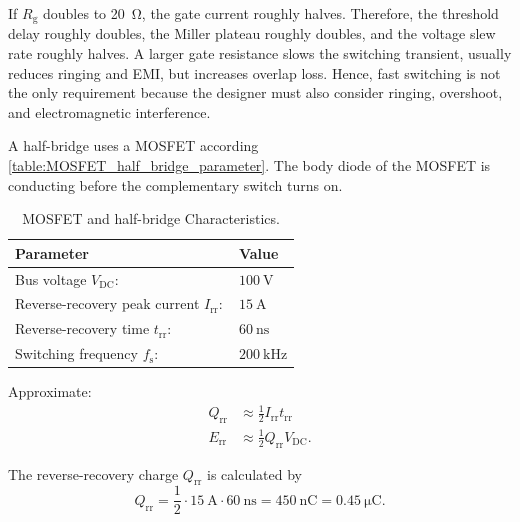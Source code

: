 \begin{solutionblock}
    If $R_\mathrm{g}$ doubles to \SI{20}{\ohm}, the gate current roughly halves. Therefore,
    the threshold delay roughly doubles, the Miller plateau roughly doubles, and the voltage slew rate roughly halves.
    A larger gate resistance slows the switching transient, usually reduces ringing and EMI, but increases overlap loss.
    Hence, fast switching is not the only requirement because the designer must also consider ringing, overshoot, and electromagnetic interference.
\end{solutionblock}




A half-bridge uses a MOSFET according \autoref{table:MOSFET_half_bridge_parameter}. The body diode of the MOSFET is conducting 
before the complementary switch turns on.

\begin{table}[ht]
    \centering
    \begin{tabular}{ll}
        \toprule
        Parameter & Value\\
        \midrule
        Bus voltage $V_\mathrm{DC}:$ & $\SI{100}{\volt}$\\
        Reverse-recovery peak current $I_\mathrm{rr}:$ & $\SI{15}{\ampere}$\\
        Reverse-recovery time $t_\mathrm{rr}:$ & $\SI{60}{\nano\second}$   \\
        Switching frequency $f_\mathrm{s}:$ & $\SI{200}{\kilo\hertz}$      \\   
        \bottomrule
    \end{tabular}
    \caption{MOSFET and half-bridge Characteristics.}
    \label{table:MOSFET_half_bridge_parameter}
\end{table}

Approximate:
\begin{align*}
    Q_\mathrm{rr} &\approx \frac{1}{2} I_\mathrm{rr} t_\mathrm{rr} \\
    E_\mathrm{rr} &\approx \frac{1}{2} Q_\mathrm{rr} V_\mathrm{DC}.
\end{align*}


\begin{solutionblock}
    The reverse-recovery charge $Q_\mathrm{rr}$ is calculated by
    \begin{equation}
        Q_\mathrm{rr}
        = \frac{1}{2} \cdot \SI{15}{\ampere} \cdot \SI{60}{\nano\second}
        = \SI{450}{\nano\coulomb}
        = \SI{0.45}{\micro\coulomb}.
    \end{equation}
\end{solutionblock}

